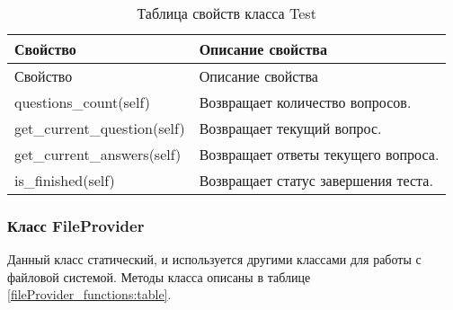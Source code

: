 \begin{xltabular}{\textwidth}{|p{6cm}|X|}
	\caption{Таблица свойств класса Test\label{test_properties:table}} \hline
	\centrow Свойство & \centrow Описание свойства \\ \hline
	\endfirsthead
	  \hline
	\centrow Свойство & \centrow Описание свойства \\ \hline
	\finishhead
	questions\_count(self) & Возвращает количество вопросов. \\ \hline
	get\_current\_question(self) & Возвращает текущий вопрос. \\ \hline
	get\_current\_answers(self) & Возвращает ответы текущего вопроса. \\ \hline
	is\_finished(self) & Возвращает статус завершения теста.
\end{xltabular}

\subsubsection{Класс FileProvider}

Данный класс статический, и используется другими классами для работы с файловой системой. Методы класса описаны в таблице \ref{fileProvider_functions:table}.


